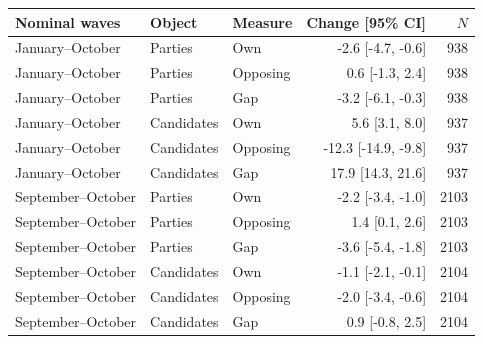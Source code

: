 \begin{tabular}{lllrr}
\toprule
Nominal waves & Object & Measure & Change [95\% CI] & $N$ \\
\midrule
January--October & Parties & Own & -2.6 [-4.7, -0.6] &  938 \\
January--October & Parties & Opposing & 0.6 [-1.3, 2.4] &  938 \\
January--October & Parties & Gap & -3.2 [-6.1, -0.3] &  938 \\
January--October & Candidates & Own & 5.6 [3.1, 8.0] &  937 \\
January--October & Candidates & Opposing & -12.3 [-14.9, -9.8] &  937 \\
January--October & Candidates & Gap & 17.9 [14.3, 21.6] &  937 \\
September--October & Parties & Own & -2.2 [-3.4, -1.0] & 2103 \\
September--October & Parties & Opposing & 1.4 [0.1, 2.6] & 2103 \\
September--October & Parties & Gap & -3.6 [-5.4, -1.8] & 2103 \\
September--October & Candidates & Own & -1.1 [-2.1, -0.1] & 2104 \\
September--October & Candidates & Opposing & -2.0 [-3.4, -0.6] & 2104 \\
September--October & Candidates & Gap & 0.9 [-0.8, 2.5] & 2104 \\
\bottomrule
\end{tabular}
